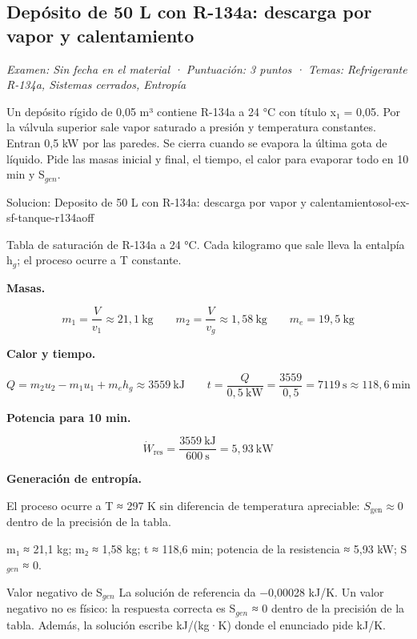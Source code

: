 \documentclass[11pt,a4paper]{article}
\begin{document}
\subsection{Depósito de 50 L con R-134a: descarga por vapor y calentamiento}
\noindent\textit{Examen: Sin fecha en el material · Puntuación: 3 puntos · Temas: Refrigerante R-134a, Sistemas cerrados, Entropía}\par\medskip

Un depósito rígido de 0,05 m³ contiene R-134a a 24 °C con título x₁ = 0,05. Por la válvula superior sale vapor saturado a presión y temperatura constantes. Entran 0,5 kW por las paredes. Se cierra cuando se evapora la última gota de líquido. Pide las masas inicial y final, el tiempo, el calor para evaporar todo en 10 min y S$_{gen}$.

\begin{ocg}{Solucion: Deposito de 50 L con R-134a: descarga por vapor y calentamiento}{sol-ex-sf-tanque-r134a}{off}
\begin{antesbox}
Tabla de saturación de R-134a a 24 °C. Cada kilogramo que sale lleva la entalpía h$_{g}$; el proceso ocurre a T constante.
\end{antesbox}

\par\medskip\noindent\textbf{Masas.}\par
\[m_1 = \frac{V}{v_1} \approx 21{,}1\ \text{kg} \qquad m_2 = \frac{V}{v_g} \approx 1{,}58\ \text{kg} \qquad m_e = 19{,}5\ \text{kg}\]

\par\medskip\noindent\textbf{Calor y tiempo.}\par
\[Q = m_2u_2 - m_1u_1 + m_eh_g \approx 3559\ \text{kJ} \qquad t = \frac{Q}{0{,}5\ \text{kW}} = \frac{3559}{0{,}5} = 7119\ \text{s} \approx 118{,}6\ \text{min}\]

\par\medskip\noindent\textbf{Potencia para 10 min.}\par
\[\dot W_{\text{res}} = \frac{3559\ \text{kJ}}{600\ \text{s}} = 5{,}93\ \text{kW}\]

\par\medskip\noindent\textbf{Generación de entropía.}\par
El proceso ocurre a T ≈ 297 K sin diferencia de temperatura apreciable:  $S_{\text{gen}} \approx 0$  dentro de la precisión de la tabla.

\begin{resbox}
m₁ ≈ 21,1 kg; m₂ ≈ 1,58 kg; t ≈ 118,6 min; potencia de la resistencia ≈ 5,93 kW; S$_{gen}$ ≈ 0.
\end{resbox}

\begin{ojobox}{Valor negativo de S$_{gen}$}
La solución de referencia da −0,00028 kJ/K. Un valor negativo no es físico: la respuesta correcta es S$_{gen}$ ≈ 0 dentro de la precisión de la tabla. Además, la solución escribe kJ/(kg·K) donde el enunciado pide kJ/K.
\end{ojobox}

\hspace{0pt}\end{ocg}
\end{document}
